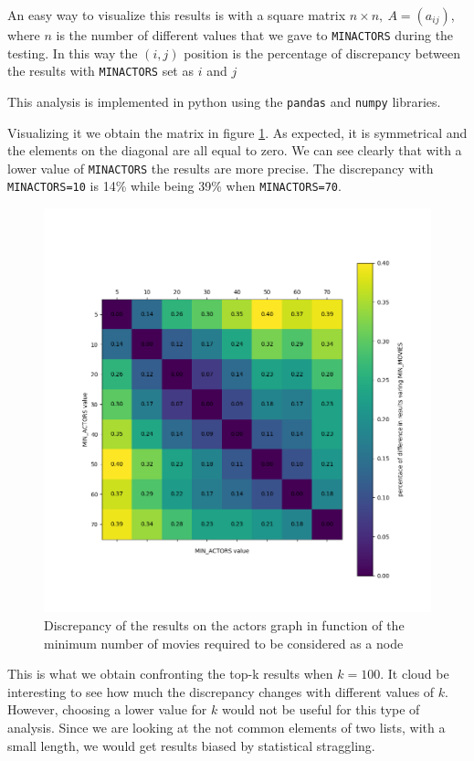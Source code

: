 \nd An easy way to visualize this results is with a square matrix $n \times n, ~ A = (a_{ij})$, where $n$ is the number of different values that we gave to \texttt{MIN\textunderscore ACTORS} during the testing. In this way the $(i,j)$ position is the percentage of discrepancy between the results with \texttt{MIN\textunderscore ACTORS} set as $i$ and $j$ \s

\nd This analysis is implemented in python using the \texttt{pandas} and \texttt{numpy} libraries.



\nd Visualizing it we obtain the matrix in figure \ref{fig:matrix-a}. As expected, it is symmetrical and the elements on the diagonal are all equal to zero. We can see clearly that with a lower value of \texttt{MIN\textunderscore ACTORS} the results are more precise. The discrepancy with \texttt{MIN\textunderscore ACTORS=10} is 14\% while being 39\% when \texttt{MIN\textunderscore ACTORS=70}.

\begin{figure}[h!]
    \centering
    \includegraphics[width=11.5cm]{Figure_1.png}
    \caption{Discrepancy of the results on the actors graph in function of the minimum number of movies required to be considered as a node}
    \label{fig:matrix-a}
\end{figure}
\s
\nd This is what we obtain confronting the top-k results when $k=100$. It cloud be interesting to see how much the discrepancy changes with different values of $k$. However, choosing a lower value for $k$ would not be useful for this type of analysis. Since we are looking at the not common elements of two lists, with a small length, we would get results biased by statistical straggling. \s

